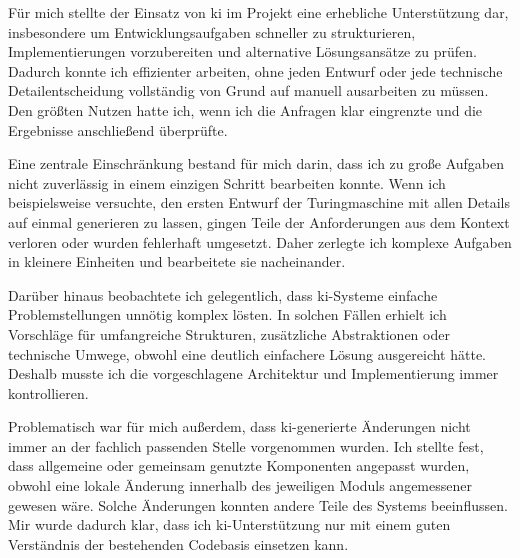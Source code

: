 
Für mich stellte der Einsatz von \gls{ki} im Projekt eine erhebliche Unterstützung dar, insbesondere um Entwicklungsaufgaben schneller zu strukturieren, Implementierungen vorzubereiten und alternative Lösungsansätze zu prüfen. Dadurch konnte ich effizienter arbeiten, ohne jeden Entwurf oder jede technische Detailentscheidung vollständig von Grund auf manuell ausarbeiten zu müssen. Den größten Nutzen hatte ich, wenn ich die Anfragen klar eingrenzte und die Ergebnisse anschließend überprüfte.

Eine zentrale Einschränkung bestand für mich darin, dass ich zu große Aufgaben nicht zuverlässig in einem einzigen Schritt bearbeiten konnte. Wenn ich beispielsweise versuchte, den ersten Entwurf der Turingmaschine mit allen Details auf einmal generieren zu lassen, gingen Teile der Anforderungen aus dem Kontext verloren oder wurden fehlerhaft umgesetzt. Daher zerlegte ich komplexe Aufgaben in kleinere Einheiten und bearbeitete sie nacheinander.

Darüber hinaus beobachtete ich gelegentlich, dass \gls{ki}-Systeme einfache Problemstellungen unnötig komplex lösten. In solchen Fällen erhielt ich Vorschläge für umfangreiche Strukturen, zusätzliche Abstraktionen oder technische Umwege, obwohl eine deutlich einfachere Lösung ausgereicht hätte. Deshalb musste ich die vorgeschlagene Architektur und Implementierung immer kontrollieren.

Problematisch war für mich außerdem, dass \gls{ki}-generierte Änderungen nicht immer an der fachlich passenden Stelle vorgenommen wurden. Ich stellte fest, dass allgemeine oder gemeinsam genutzte Komponenten angepasst wurden, obwohl eine lokale Änderung innerhalb des jeweiligen Moduls angemessener gewesen wäre. Solche Änderungen konnten andere Teile des Systems beeinflussen. Mir wurde dadurch klar, dass ich \gls{ki}-Unterstützung nur mit einem guten Verständnis der bestehenden Codebasis einsetzen kann.
